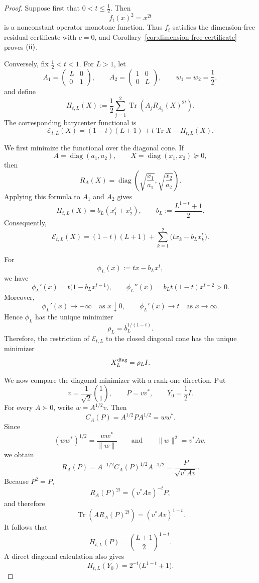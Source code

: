 \documentclass[11pt]{amsart}
\theoremstyle{definition}
\theoremstyle{remark}
\newcommand{\Tr}{\operatorname{Tr}}
\begin{document}
	\begin{proof}
		Suppose first that $0<t\le\frac12$.  Then
		\[
		f_t(x)^2=x^{2t}
		\]
		is a nonconstant operator monotone function.  Thus $f_t$ satisfies
		the dimension-free residual certificate with $c=0$, and
		Corollary~\ref{cor:dimension-free-certificate} proves ${\rm(ii)}$.
		
		Conversely, fix $\frac12<t<1$.  For $L>1$, let
		\[
		A_1=\begin{pmatrix}L&0\\0&1\end{pmatrix},
		\qquad
		A_2=\begin{pmatrix}1&0\\0&L\end{pmatrix},
		\qquad
		w_1=w_2=\frac12,
		\]
		and define
		\[
		H_{t,L}(X)
		:=\frac12\sum_{j=1}^2
		\Tr\!\left(A_jR_{A_j}(X)^{2t}\right).
		\]
		The corresponding barycenter functional is
		\begin{equation}\label{eq:power-counterexample-energy}
			\mathcal E_{t,L}(X)
			=(1-t)(L+1)+t\Tr X-H_{t,L}(X).
		\end{equation}
		
		We first minimize the functional over the diagonal cone.  If
		\[
		A=\operatorname{diag}(a_1,a_2),
		\qquad
		X=\operatorname{diag}(x_1,x_2)\succeq0,
		\]
		then
		\[
		R_A(X)
		=\operatorname{diag}\left(
		\sqrt{\frac{x_1}{a_1}},
		\sqrt{\frac{x_2}{a_2}}
		\right).
		\]
		Applying this formula to $A_1$ and $A_2$ gives
		\[
		H_{t,L}(X)
		=b_L(x_1^t+x_2^t),
		\qquad
		b_L:=\frac{L^{1-t}+1}{2}.
		\]
		Consequently,
		\[
		\mathcal E_{t,L}(X)
		=(1-t)(L+1)
		+\sum_{k=1}^2\bigl(tx_k-b_Lx_k^t\bigr).
		\]
		
		For
		\[
		\phi_L(x):=tx-b_Lx^t,
		\]
		we have
		\[
		\phi_L'(x)
		=t\bigl(1-b_Lx^{t-1}\bigr),
		\qquad
		\phi_L''(x)
		=b_Lt(1-t)x^{t-2}>0.
		\]
		Moreover,
		\[
		\phi_L'(x)\longrightarrow-\infty
		\quad\text{as }x\downarrow0,
		\qquad
		\phi_L'(x)\longrightarrow t
		\quad\text{as }x\to\infty.
		\]
		Hence $\phi_L$ has the unique minimizer
		\[
		\rho_L=b_L^{1/(1-t)}.
		\]
		Therefore, the restriction of $\mathcal E_{t,L}$ to the closed
		diagonal cone has the unique minimizer
		\[
		X_L^{\rm diag}=\rho_LI.
		\]
		
		We now compare the diagonal minimizer with a rank-one direction.  Put
		\[
		v=\frac1{\sqrt2}\binom11,
		\qquad
		P=vv^*,
		\qquad
		Y_0=\frac12I.
		\]
		For every $A\succ0$, write $w=A^{1/2}v$.  Then
		\[
		C_A(P)=A^{1/2}PA^{1/2}=ww^*.
		\]
		Since
		\[
		(ww^*)^{1/2}=\frac{ww^*}{\|w\|}
		\qquad\text{and}\qquad
		\|w\|^2=v^*Av,
		\]
		we obtain
		\begin{equation}\label{eq:rank-one-riccati-root}
			R_A(P)
			=A^{-1/2}C_A(P)^{1/2}A^{-1/2}
			=\frac{P}{\sqrt{v^*Av}}.
		\end{equation}
		Because $P^2=P$,
		\[
		R_A(P)^{2t}=(v^*Av)^{-t}P,
		\]
		and therefore
		\[
		\Tr\!\left(AR_A(P)^{2t}\right)
		=(v^*Av)^{1-t}.
		\]
		It follows that
		\[
		H_{t,L}(P)
		=\left(\frac{L+1}{2}\right)^{1-t}.
		\]
		A direct diagonal calculation also gives
		\[
		H_{t,L}(Y_0)
		=2^{-t}\bigl(L^{1-t}+1\bigr).
		\]
		

\end{proof}
\end{document}

